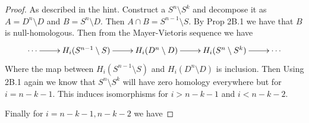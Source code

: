 \documentclass[10pt]{article}
\theoremstyle{plain}
\theoremstyle{remark}
\begin{document}
\begin{proof}
  As described in the hint. Construct a $S^n\setminus S^k$ and decompose it
  as $A= D^n\setminus D$ and $B=S^n\setminus D$. Then $A\cap B=S^{n-1}\setminus S$. By
  Prop 2B.1 we have that $B$ is null-homologous. Then from the Mayer-Vietoris
  sequence we have
  \[
    \xymatrix{
      \cdots \ar[r] & H_i(S^{n-1}\setminus S) \ar[r] & H_i(D^n\setminus D) \ar[r] & H_i(S^n\setminus S^k) \ar[r] & \cdots
    }
  \]
  Where the map between $H_i(S^{n-1}\setminus S)$ and $H_i(D^n\setminus D)$ is inclusion. Then
  Using 2B.1 again we know that $S^n\setminus S^k$ will have zero homology everywhere
  but for $i=n-k-1$. This induces isomorphisms for $i>n-k-1$ and $i<n-k-2$.

  Finally for $i=n-k-1,n-k-2$ we have 
\end{proof}

\end{document}
